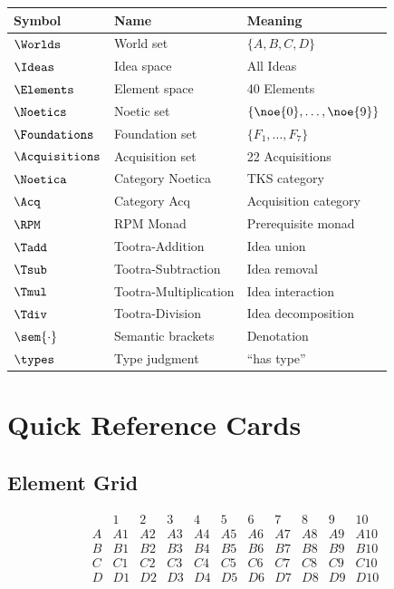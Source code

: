 \begin{longtable}{lll}
\toprule
\textbf{Symbol} & \textbf{Name} & \textbf{Meaning} \\
\midrule
$\Worlds$ & World set & $\{A, B, C, D\}$ \\
$\Ideas$ & Idea space & All Ideas \\
$\Elements$ & Element space & 40 Elements \\
$\Noetics$ & Noetic set & $\{\noe{0}, \ldots, \noe{9}\}$ \\
$\Foundations$ & Foundation set & $\{F_1, \ldots, F_7\}$ \\
$\Acquisitions$ & Acquisition set & 22 Acquisitions \\
$\Noetica$ & Category Noetica & TKS category \\
$\Acq$ & Category Acq & Acquisition category \\
$\RPM$ & RPM Monad & Prerequisite monad \\
$\Tadd$ & Tootra-Addition & Idea union \\
$\Tsub$ & Tootra-Subtraction & Idea removal \\
$\Tmul$ & Tootra-Multiplication & Idea interaction \\
$\Tdiv$ & Tootra-Division & Idea decomposition \\
$\sem{\cdot}$ & Semantic brackets & Denotation \\
$\types$ & Type judgment & ``has type'' \\
\bottomrule
\end{longtable}

\chapter{Quick Reference Cards}
\label{app:quickref}

\section{Element Grid}

\[
\begin{array}{c|cccccccccc}
 & 1 & 2 & 3 & 4 & 5 & 6 & 7 & 8 & 9 & 10 \\
\hline
A & A1 & A2 & A3 & A4 & A5 & A6 & A7 & A8 & A9 & A10 \\
B & B1 & B2 & B3 & B4 & B5 & B6 & B7 & B8 & B9 & B10 \\
C & C1 & C2 & C3 & C4 & C5 & C6 & C7 & C8 & C9 & C10 \\
D & D1 & D2 & D3 & D4 & D5 & D6 & D7 & D8 & D9 & D10 \\
\end{array}
\]

